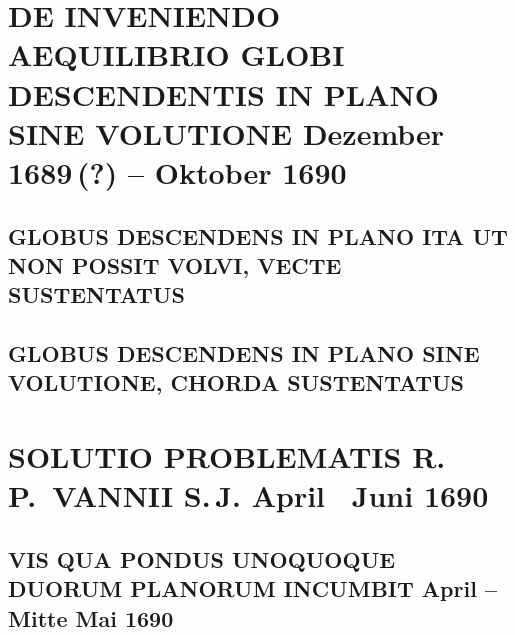 \documentclass[%
fontsize=10pt,
]{scrbook}
\DeclareRobustCommand{\bracks}[1]{%
\textup{\lbrack}#1\textup{\rbrack}}
\begin{document}
\chapter[tocentry={De inveniendo aequilibrio  globi descendentis in plano sine volutione
\enskip \bracks{Dezember 1689\,(?) -- Oktober 1690}},
head={De inveniendo aequilibrio  globi descendentis in plano sine volutione}]
{\MakeUppercase{De inveniendo aequilibrio  globi descendentis in plano sine volutione}
\newline \bracks{Dezember 1689\,(?) -- Oktober 1690}}
\label{intro_globus-volutione}

\section[tocentry={Globus descendens in plano ita ut non possit volvi, vecte sustentatus},
head={Globus descendens ita ut non possit volvi, vecte sustentatus}]
{\MakeUppercase{Globus descendens in plano ita ut non possit volvi, vecte sustentatus}%
}
\label{60112}

\section[tocentry={Globus descendens in plano sine volutione, chorda sustentatus},
head={Globus descendens sine volutione, chorda sustentatus}]
{\MakeUppercase{Globus descendens in plano sine volutione, chorda sustentatus}}
\label{60220}




\chapter[tocentry={Solutio problematis R.\,P.~Vannii S.\,J.
\enskip \bracks{April \textendash\ Juni 1690}},
head={Solutio problematis R.\,P.~Vannii S.\,J.}]
{\MakeUppercase{Solutio problematis R.\,P.~Vannii S.\,J.}
\newline \bracks{April \textendash\ Juni 1690}}
\label{intro_vanni-solutio-problematis}

\section[tocentry={Vis qua pondus unoquoque duorum planorum incumbit
\enskip \bracks{April -- Mitte Mai 1690}},
head={Vis qua pondus unoquoque duorum planorum incumbit}]
{\MakeUppercase{Vis qua pondus unoquoque duorum planorum incumbit}
\newline \bracks{April -- Mitte Mai 1690}}
\label{60631}

\end{document}
